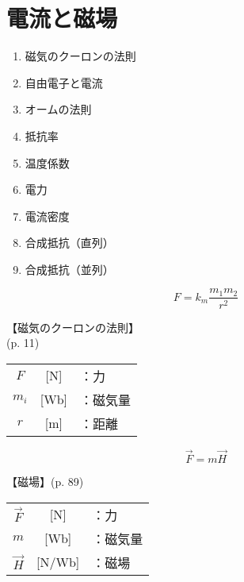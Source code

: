 \documentclass[10pt]{jarticle}
\begin{document}
\newpage
\addtocounter{page}{-1}
\thispagestyle{empty}
\section{電流と磁場}

\begin{enumerate}
\setcounter{enumi}{\thepage}
\small
\itemsep-4mm
\item 磁気のクーロンの法則 \\
\item 自由電子と電流 \\
\item オームの法則 \\
\item 抵抗率 \\
\item 温度係数 \\
\item 電力 \\
\item 電流密度 \\
\item 合成抵抗（直列） \\
\item 合成抵抗（並列） \\
\end{enumerate}



\newpage
\[
F = k_m \frac{m_1 m_2}{r^2}
\]


\vskip3mm
【磁気のクーロンの法則】\\
\hfill {\footnotesize (p. 11)}

\begin{tabular}{ccl}
$F$	&[N]	&：力 \\
$m_i$	&[Wb]	&：磁気量 \\
$r$	&[m]	&：距離
\end{tabular}








\newpage
\[
\vec{F} = m \vec{H}
\]


\vskip3mm
【磁場】{\footnotesize (p. 89)}

\begin{tabular}{ccl}
$\vec{F}$	&[N]	&：力 \\
$m$	&[Wb]	&：磁気量 \\
$\vec{H}$	&[N/Wb]	&：磁場
\end{tabular}
\end{document}
